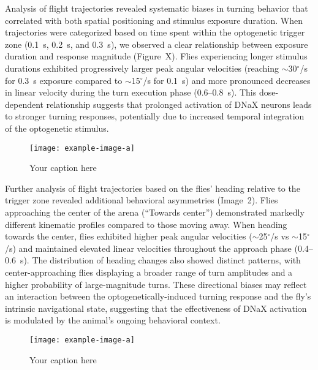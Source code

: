 \documentclass[../main/thesis_msc.tex]{subfiles}
\begin{document}
Analysis of flight trajectories revealed systematic biases in turning behavior that correlated with both spatial positioning and stimulus exposure duration. When trajectories were categorized based on time spent within the optogenetic trigger zone (0.1~s, 0.2~s, and 0.3~s), we observed a clear relationship between exposure duration and response magnitude (Figure~X). Flies experiencing longer stimulus durations exhibited progressively larger peak angular velocities (reaching $\sim$30$^{\circ}$/s for 0.3~s exposure compared to $\sim$15$^{\circ}$/s for 0.1~s) and more pronounced decreases in linear velocity during the turn execution phase (0.6--0.8~s). This dose-dependent relationship suggests that prolonged activation of DNaX neurons leads to stronger turning responses, potentially due to increased temporal integration of the optogenetic stimulus.

\begin{figure}[htbp]
    \centering
    \texttt{[image: example-image-a]}
    \caption{Your caption here}
    \label{fig:your-label}
\end{figure}

Further analysis of flight trajectories based on the flies' heading relative to the trigger zone revealed additional behavioral asymmetries (Image~2). Flies approaching the center of the arena (``Towards center'') demonstrated markedly different kinematic profiles compared to those moving away. When heading towards the center, flies exhibited higher peak angular velocities ($\sim$25$^{\circ}$/s vs $\sim$15$^{\circ}$/s) and maintained elevated linear velocities throughout the approach phase (0.4--0.6~s). The distribution of heading changes also showed distinct patterns, with center-approaching flies displaying a broader range of turn amplitudes and a higher probability of large-magnitude turns. These directional biases may reflect an interaction between the optogenetically-induced turning response and the fly's intrinsic navigational state, suggesting that the effectiveness of DNaX activation is modulated by the animal's ongoing behavioral context.

\begin{figure}[htbp]
    \centering
    \texttt{[image: example-image-a]}
    \caption{Your caption here}
    \label{fig:your-label}
\end{figure}
\end{document}
